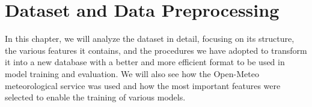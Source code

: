 \chapter{Dataset and Data Preprocessing}\label{chap:datapreprocessing}

In this chapter, we will analyze the dataset in detail, focusing on its structure, the various features it contains, and the procedures we have adopted to transform it into a new database with a better and more efficient format to be used in model training and evaluation. We will also see how the Open-Meteo meteorological service was used and how the most important features were selected to enable the training of various models.



%


